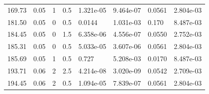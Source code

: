 \documentclass[preview]{standalone}
\begin{document}
{{\begin{tabular}{L{1.2cm}C{1.2cm} C{0.3cm}C{0.5cm} C{1.4cm}C{1.4cm} C{1.4cm}C{1.4cm}}
  169.73  &  0.05  & 1     & 0.5 &  1.321e-05  & 9.464e-07  & 0.0561 &  2.804e-03   \\ 
  181.50  &  0.05  & 0     & 0.5 &  0.0144  & 1.031e-03  & 0.170 &  8.487e-03   \\ 
  184.45  &  0.05  & 0     & 1.5 &  6.358e-06  & 4.556e-07  & 0.0550 &  2.752e-03   \\ 
  185.31  &  0.05  & 0     & 0.5 &  5.033e-05  & 3.607e-06  & 0.0561 &  2.804e-03   \\ 
  185.69  &  0.05  & 1     & 0.5 &  0.727  & 5.208e-03  & 0.0170 &  8.487e-03   \\ 
  193.71  &  0.06  & 2     & 2.5 &  4.214e-08  & 3.020e-09  & 0.0542 &  2.709e-03   \\ 
  194.45  &  0.06  & 2     & 0.5 &  1.094e-05  & 7.839e-07  & 0.0561 &  2.804e-03   \\ 
\hline 
\end{tabular} 

}}
\end{document}
